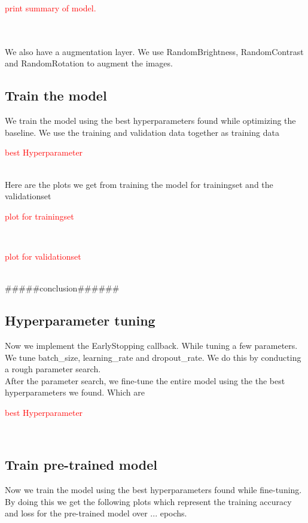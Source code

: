 \documentclass[conference]{IEEEtran}
\begin{document}
\centerline{\textcolor{red}{print summary of model.}}\\
\\
We also have a augmentation layer. We use RandomBrightness, RandomContrast and RandomRotation to augment the images.\\

\subsection{Train the model}

We train the model using the best hyperparameters found while optimizing the
baseline. We use the training and validation data together as training data\\

\centerline{\textcolor{red}{best Hyperparameter}}\\

Here are the plots we get from training the model for trainingset and the validationset\\

\centerline{\textcolor{red}{plot for trainingset}}\\
\centerline{\textcolor{red}{plot for validationset}}\\

#####conclusion######


\subsection{Hyperparameter tuning}
Now we implement the EarlyStopping callback. While tuning a few parameters. We tune batch_size, learning_rate and dropout_rate. We do this by conducting a rough parameter search.\\

After the parameter search, we fine-tune the entire model using the the best hyperparameters we found. Which are\\
\centerline{\textcolor{red}{best Hyperparameter}}\\

\subsection{Train pre-trained model}
Now we train the model using the best hyperparameters found while fine-tuning.\\
By doing this we get the following plots which represent the training accuracy and loss for the pre-trained model over ... epochs.\\
\end{document}
